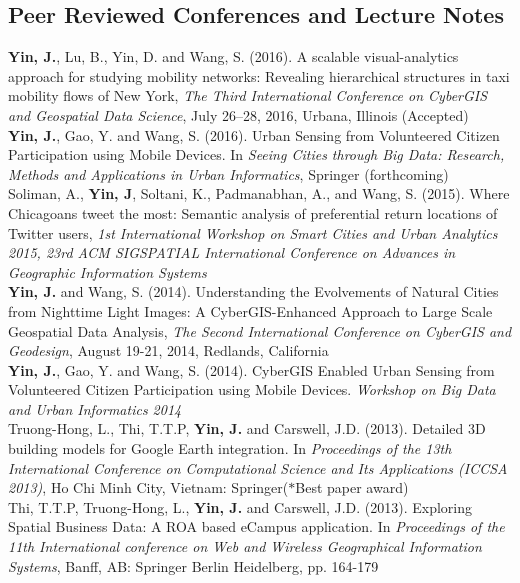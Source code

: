 \documentclass[11pt, a4paper]{article}
\newcommand{\years}[1]{\marginnote{\scriptsize #1}}
\begin{document}
\subsection*{Peer Reviewed Conferences and Lecture Notes}
\noindent
\years{2016}\textbf{Yin, J.}, Lu, B., Yin, D. and Wang, S. (2016). A scalable visual-analytics approach for studying mobility networks: Revealing hierarchical structures in taxi mobility flows of New York, \textit{The Third International Conference on CyberGIS and Geospatial Data Science}, July 26–28, 2016, Urbana, Illinois (Accepted)\\
\years{2016}\textbf{Yin, J.}, Gao, Y. and Wang, S. (2016). Urban Sensing from Volunteered Citizen Participation using Mobile Devices. In \emph{Seeing Cities through Big Data: Research, Methods and Applications in Urban Informatics}, Springer (forthcoming)\\
\years{2015}Soliman, A., \textbf{Yin, J}, Soltani, K., Padmanabhan, A., and Wang, S. (2015). Where Chicagoans tweet the most: Semantic analysis of preferential return locations of Twitter users, \emph{1st International Workshop on Smart Cities and Urban Analytics 2015, 23rd ACM SIGSPATIAL International Conference on Advances in Geographic Information Systems}\\ 
\years{2014}\textbf{Yin, J.} and Wang, S. (2014). Understanding the Evolvements of Natural Cities from Nighttime Light Images: A CyberGIS-Enhanced Approach to Large Scale Geospatial Data Analysis, \textit{The Second International Conference on CyberGIS and Geodesign}, August 19-21, 2014, Redlands, California\\
\years{2014}\textbf{Yin, J.}, Gao, Y. and Wang, S. (2014). CyberGIS Enabled Urban Sensing from Volunteered Citizen Participation using Mobile Devices. \emph{Workshop on Big Data and Urban Informatics 2014}\\
\years{2013}Truong-Hong, L., Thi, T.T.P, \textbf{Yin, J.} and Carswell, J.D. (2013). Detailed 3D building models for Google Earth integration. In \emph{Proceedings of the 13th International Conference on Computational Science and Its Applications (ICCSA 2013)}, Ho Chi Minh City, Vietnam: Springer($*$Best paper award)\\
\years{2013}Thi, T.T.P, Truong-Hong, L., \textbf{Yin, J.} and Carswell, J.D. (2013). Exploring Spatial Business Data: A ROA based eCampus application. In \emph{Proceedings of the 11th International conference on Web and Wireless Geographical Information Systems}, Banff, AB: Springer Berlin Heidelberg, pp. 164-179\\
\end{document}
